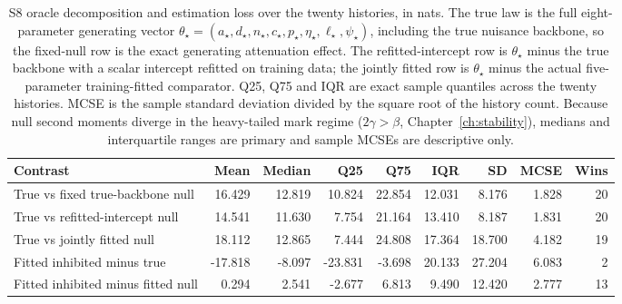 \begin{table}[htbp]\centering\scriptsize
\setlength{\tabcolsep}{2.6pt}
\begin{tabular}{@{}lrrrrrrrr@{}}\toprule
Contrast & Mean & Median & Q25 & Q75 & IQR & SD & MCSE & Wins\\\midrule
True vs fixed true-backbone null & 16.429 & 12.819 & 10.824 & 22.854 & 12.031 & 8.176 & 1.828 & 20 \\
True vs refitted-intercept null & 14.541 & 11.630 & 7.754 & 21.164 & 13.410 & 8.187 & 1.831 & 20 \\
True vs jointly fitted null & 18.112 & 12.865 & 7.444 & 24.808 & 17.364 & 18.700 & 4.182 & 19 \\
Fitted inhibited minus true & -17.818 & -8.097 & -23.831 & -3.698 & 20.133 & 27.204 & 6.083 & 2 \\
Fitted inhibited minus fitted null & 0.294 & 2.541 & -2.677 & 6.813 & 9.490 & 12.420 & 2.777 & 13 \\
\bottomrule\end{tabular}
\caption{S8 oracle decomposition and estimation loss over the twenty histories, in nats. The true law is the full eight-parameter generating vector $\theta_\star=(a_\star,d_\star,n_\star,c_\star,p_\star,\eta_\star,\ell_\star,\psi_\star)$, including the true nuisance backbone, so the fixed-null row is the exact generating attenuation effect. The refitted-intercept row is $\theta_\star$ minus the true backbone with a scalar intercept refitted on training data; the jointly fitted row is $\theta_\star$ minus the actual five-parameter training-fitted comparator. Q25, Q75 and IQR are exact sample quantiles across the twenty histories. MCSE is the sample standard deviation divided by the square root of the history count. Because null second moments diverge in the heavy-tailed mark regime ($2\gamma>\beta$, Chapter~\ref{ch:stability}), medians and interquartile ranges are primary and sample MCSEs are descriptive only.}
\label{tab:s8-oracle}
\end{table}

